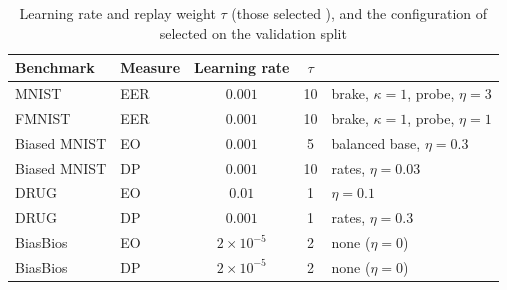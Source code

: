 \begin{table}[t]
\centering
\caption{Learning rate and replay weight $\tau$ (those \fsw{} selected \cite{park2026fsw}), and the configuration of \method{} selected on the validation split}\label{tab:settings}
\footnotesize
\begin{tabular}{llccl}
\toprule
Benchmark & Measure & Learning rate & $\tau$ & \method{} \\
\midrule
MNIST & EER & $0.001$ & 10 & brake, $\kappa = 1$, probe, $\eta = 3$ \\
FMNIST & EER & $0.001$ & 10 & brake, $\kappa = 1$, probe, $\eta = 1$ \\
Biased MNIST & EO & $0.001$ & 5 & balanced base, $\eta = 0.3$ \\
Biased MNIST & DP & $0.001$ & 10 & rates, $\eta = 0.03$ \\
DRUG & EO & $0.01$ & 1 & $\eta = 0.1$ \\
DRUG & DP & $0.001$ & 1 & rates, $\eta = 0.3$ \\
BiasBios & EO & $2\times 10^{-5}$ & 2 & none ($\eta = 0$) \\
BiasBios & DP & $2\times 10^{-5}$ & 2 & none ($\eta = 0$) \\
\bottomrule
\end{tabular}
\end{table}
